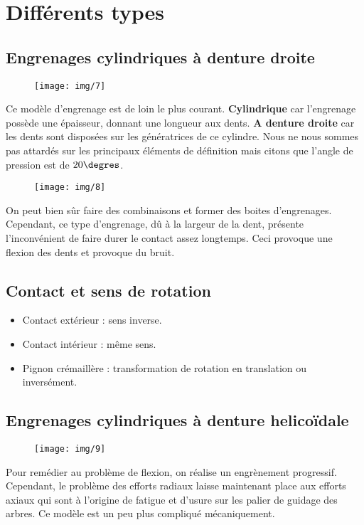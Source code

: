 \section{Différents types}
\subsection{Engrenages cylindriques à denture droite}
	\begin{wrapfigure}[5]{l}{2.5cm}
	\vspace{-5mm}
	\texttt{[image: img/7]}
	\end{wrapfigure}	
	\noindent Ce modèle d'engrenage est de loin le plus courant. \textbf{Cylindrique} car l'engrenage possède une épaisseur, donnant une longueur aux dents. \textbf{A denture droite} car les dents sont disposées sur les génératrices de ce cylindre. Nous ne nous sommes pas attardés sur les principaux éléments de définition mais citons que l'angle de pression est de $20\degres$.
	
	\begin{wrapfigure}[5]{r}{2.5cm}
	\vspace{-5mm}
	\texttt{[image: img/8]}
	\end{wrapfigure}	
	\noindent On peut bien sûr faire des combinaisons et former des boites d'engrenages. Cependant, ce type d'engrenage, dû à la largeur de la dent, présente l'inconvénient de faire durer le contact assez longtemps. Ceci provoque une flexion des dents et provoque du bruit.
	
\subsection{Contact et sens de rotation}
	\begin{itemize}
	\item Contact extérieur : sens inverse.
	\item Contact intérieur : même sens.
	\item Pignon crémaillère : transformation de rotation en translation ou inversément. 
	\end{itemize}
	
\subsection{Engrenages cylindriques à denture helicoïdale}
	\begin{wrapfigure}[5]{l}{2cm}
	\vspace{-5mm}
	\texttt{[image: img/9]}
	\end{wrapfigure}	
	\noindent Pour remédier au problème de flexion, on réalise un engrènement progressif. Cependant, le problème des efforts radiaux laisse maintenant place aux efforts axiaux qui sont à l'origine de fatigue et d'usure sur les palier de guidage des arbres. Ce modèle est un peu plus compliqué mécaniquement. \\
	
